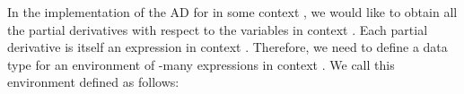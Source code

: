 In the implementation of the AD for  in some context , we would like to obtain
all the partial derivatives with respect to the variables in context .  Each partial
derivative is itself an expression  in context .  Therefore, we need to define
a data type for an environment of -many expressions in context .  We call this
environment  defined as follows:
\begin{code}[hide]%
\>[0]\AgdaSpace{}%
\AgdaSpace{}%
\<%
\\
\>[0][@{}l@{\AgdaIndent{0}}]%
\>[2]\AgdaSpace{}%
\AgdaSpace{}%
\<%
\\
%
\>[2]\AgdaSpace{}%
\AgdaSpace{}%
\AgdaSpace{}%
\AgdaSpace{}%
\<%
\\
%
\>[2]\AgdaSpace{}%
\AgdaSpace{}%
\AgdaSpace{}%
\AgdaSymbol{(}\AgdaSymbol{;}\AgdaSpace{}%
\AgdaSymbol{;}\AgdaSpace{}%
\AgdaSymbol{)}\<%
\\
%
\>[2]\AgdaSpace{}%
\AgdaSpace{}%
\AgdaSpace{}%
\AgdaSymbol{(}\AgdaSymbol{;}\AgdaSpace{}%
\AgdaSymbol{;}\AgdaSpace{}%
\AgdaSymbol{)}\<%
\\
%
\>[2]\AgdaSpace{}%
\<%
\\
%
\\[\AgdaEmptyExtraSkip]%
%
\>[2]\<%
\\
%
\>[2]\AgdaSpace{}%
\AgdaSpace{}%
\AgdaOperator{\AgdaFunction{\AgdaUnderscore{},,\AgdaUnderscore{}}}\<%
\\
%
\>[2]\AgdaOperator{\AgdaFunction{\AgdaUnderscore{},,\AgdaUnderscore{}}}\AgdaSpace{}%
\AgdaSymbol{:}\AgdaSpace{}%
\AgdaSpace{}%
\AgdaSpace{}%
\AgdaSpace{}%
\AgdaSpace{}%
\AgdaSpace{}%
\AgdaSpace{}%
\<%
\\
%
\>[2]\AgdaOperator{\AgdaFunction{\AgdaUnderscore{},,\AgdaUnderscore{}}}\AgdaSpace{}%
\AgdaSymbol{=}\AgdaSpace{}%
\<%
\end{code}
